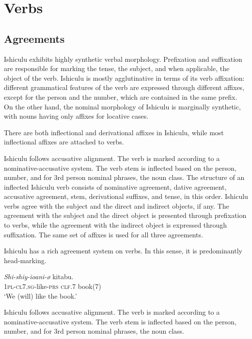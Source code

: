 \chapter{Verbs}

\section{Agreements}

Ishiculu exhibits highly synthetic verbal morphology. Prefixation and suffixation are responsible for marking the tense, the subject, and when applicable, the object of the verb. Ishiculu is mostly agglutinative in terms of its verb affixation: different grammatical features of the verb are expressed through different affixes, except for the person and the number, which are contained in the same prefix. On the other hand, the nominal morphology of Ishiculu is marginally synthetic, with nouns having only affixes for locative cases.

There are both inflectional and derivational affixes in Ishiculu, while most inflectional affixes are attached to verbs.

Ishiculu follows accusative alignment. The verb is marked according to a nominative-accusative system. The verb stem is inflected based on the person, number, and for 3rd person nominal phrases, the noun class. The structure of an inflected Ishiculu verb consists of nominative agreement, dative agreement, accusative agreement, stem, derivational suffixes, and tense, in this order. Ishiculu verbs agree with the subject and the direct and indirect objects, if any. The agreement with the subject and the direct object is presented through prefixation to verbs, while the agreement with the indirect object is expressed through suffixation. The same set of affixes is used for all three agreements.

Ishiculu has a rich agreement system on verbs. In this sense, it is predominantly head-marking.

\begin{exe}
\ex
\gll \textit{Shi-shiy-ioani-\o}  kitabu. \\
\textsc{1pl}-\textsc{cl7.sg}-like-\textsc{prs} \textsc{clf}.7 book(7) \\
\trans `We (will) like the book.'
\end{exe}

Ishiculu follows accusative alignment. The verb is marked according to a nominative-accusative system. The verb stem is inflected based on the person, number, and for 3rd person nominal phrases, the noun class.

